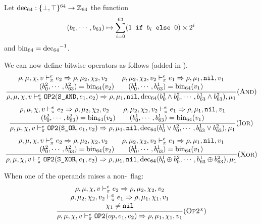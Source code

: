 Let \(\operatorname{dec_{64}}: \{ \bot, \top \}^{64} \to \mathbb{Z}_{64}\) the function
\[(b_0, \cdots, b_{63}) \mapsto \sum_{i=0}^{63} (1\texttt{ if } b_i\texttt{ else }0)\times 2^i\]
and \(\operatorname{bin_{64}} = \operatorname{dec_{64}}^{-1}\).

We can now define bitwise operators as follows (added in \Cmp).\\
\[\dfrac{\begin{array}{c}
    \rho,\mu,\chi,v \vdash_\pi^e e_2\Rightarrow \rho,\mu_2,\chi_2,v_2 \qquad \rho,\mu_2,\chi_2,v_2\vdash_\pi^e e_1\Rightarrow \rho,\mu_1,\texttt{nil},v_1 \\
    (b_0^2,\cdots,b_{63}^2) = \operatorname{bin_{64}}(v_2) \qquad (b_0^1,\cdots,b_{63}^1) = \operatorname{bin_{64}}(v_1)
\end{array}}{\rho,\mu,\chi,v \vdash_\pi^e \texttt{OP2}(\texttt{S\_AND}, e_1, e_2) \Rightarrow \rho,\mu_1,\texttt{nil},\operatorname{dec_{64}}(b_0^1 \wedge b_0^2,\cdots, b_{63}^1 \wedge b_{63}^2),\mu_1} (\textsc{And})\]
\[\dfrac{\begin{array}{c}
    \rho,\mu,\chi,v \vdash_\pi^e e_2\Rightarrow \rho,\mu_2,\chi_2,v_2 \qquad \rho,\mu_2,\chi_2,v_2\vdash_\pi^e e_1\Rightarrow \rho,\mu_1,\texttt{nil},v_1 \\
    (b_0^2,\cdots,b_{63}^2) = \operatorname{bin_{64}}(v_2) \qquad (b_0^1,\cdots,b_{63}^1) = \operatorname{bin_{64}}(v_1)
\end{array}}{\rho,\mu,\chi,v \vdash_\pi^e \texttt{OP2}(\texttt{S\_OR}, e_1, e_2) \Rightarrow \rho,\mu_1,\texttt{nil},\operatorname{dec_{64}}(b_0^1 \vee b_0^2,\cdots, b_{63}^1 \vee b_{63}^2),\mu_1} (\textsc{Ior})\]
\[\dfrac{\begin{array}{c}
    \rho,\mu,\chi,v \vdash_\pi^e e_2\Rightarrow \rho,\mu_2,\chi_2,v_2 \qquad \rho,\mu_2,\chi_2,v_2\vdash_\pi^e e_1\Rightarrow \rho,\mu_1,\texttt{nil},v_1 \\
    (b_0^2,\cdots,b_{63}^2) = \operatorname{bin_{64}}(v_2) \qquad (b_0^1,\cdots,b_{63}^1) = \operatorname{bin_{64}}(v_1)
\end{array}}{\rho,\mu,\chi,v \vdash_\pi^e \texttt{OP2}(\texttt{S\_XOR}, e_1, e_2) \Rightarrow \rho,\mu_1,\texttt{nil},\operatorname{dec_{64}}(b_0^1 \oplus b_0^2,\cdots, b_{63}^1 \oplus b_{63}^2),\mu_1} (\textsc{Xor})\]

When one of the operands raises a non-\nil\ flag:
\[\dfrac{\begin{array}{c}
    \rho,\mu,\chi,v \vdash_\pi^e e_2\Rightarrow \rho,\mu_2,\chi_2,v_2 \\
    \rho,\mu_2,\chi_2,v_2 \vdash_\pi^e e_1\Rightarrow \rho,\mu_1,\chi_1,v_1 \\
    \chi_1\ne\texttt{nil}
\end{array}}{\rho,\mu,\chi,v \vdash_\pi^e \texttt{OP2}(op, e_1, e_2) \Rightarrow \rho,\mu_1,\chi_1,v_1} (\textsc{Op2}^\chi)\]


